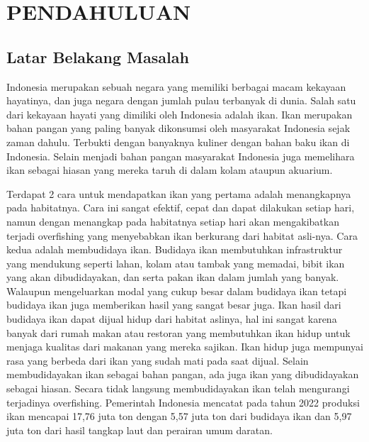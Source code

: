 
\chapter{PENDAHULUAN}

\section{Latar Belakang Masalah}

	Indonesia merupakan sebuah negara yang memiliki berbagai macam 
kekayaan hayatinya, dan juga negara dengan jumlah pulau terbanyak di dunia. 
Salah satu dari kekayaan hayati yang dimiliki oleh Indonesia adalah ikan. Ikan 
merupakan bahan pangan yang paling banyak dikonsumsi oleh masyarakat 
Indonesia sejak zaman dahulu. Terbukti dengan banyaknya kuliner dengan bahan 
baku ikan di Indonesia. Selain menjadi bahan pangan masyarakat Indonesia juga 
memelihara ikan sebagai hiasan yang mereka taruh di dalam kolam ataupun 
akuarium.

Terdapat 2 cara untuk mendapatkan ikan yang pertama adalah menangkapnya pada habitatnya. 
Cara ini sangat efektif, cepat dan dapat dilakukan setiap hari, namun dengan menangkap 
pada habitatnya setiap hari akan mengakibatkan terjadi overfishing yang menyebabkan ikan 
berkurang dari habitat asli-nya. Cara kedua adalah membudidaya ikan. Budidaya ikan membutuhkan 
infrastruktur yang mendukung seperti lahan, kolam atau tambak yang memadai, bibit ikan yang akan 
dibudidayakan, dan serta pakan ikan dalam jumlah yang banyak. Walaupun mengeluarkan modal yang cukup besar 
dalam budidaya ikan tetapi budidaya ikan juga memberikan hasil yang sangat besar juga. Ikan hasil dari budidaya ikan dapat 
dijual hidup dari habitat aslinya, hal ini sangat karena banyak dari rumah makan atau restoran yang membutuhkan ikan hidup 
untuk menjaga kualitas dari makanan yang mereka sajikan. Ikan hidup juga mempunyai rasa yang berbeda dari ikan yang sudah 
mati pada saat dijual. Selain membudidayakan ikan sebagai bahan pangan, ada juga ikan yang dibudidayakan sebagai hiasan. 
Secara tidak langsung membudidayakan ikan telah mengurangi terjadinya overfishing. 
Pemerintah Indonesia mencatat pada tahun 2022 produksi ikan mencapai 17,76 juta ton dengan 5,57 juta ton dari budidaya ikan 
dan 5,97 juta ton dari hasil tangkap laut dan perairan umum daratan.

